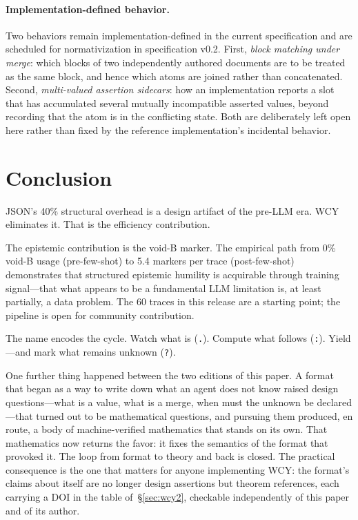\documentclass[11pt,a4paper]{article}
\begin{document}
\paragraph{Implementation-defined behavior.} Two behaviors remain implementation-defined in the current specification and are scheduled for normativization in specification v0.2. First, \emph{block matching under merge}: which blocks of two independently authored documents are to be treated as the same block, and hence which atoms are joined rather than concatenated. Second, \emph{multi-valued assertion sidecars}: how an implementation reports a slot that has accumulated several mutually incompatible asserted values, beyond recording that the atom is in the conflicting state. Both are deliberately left open here rather than fixed by the reference implementation's incidental behavior.

\section{Conclusion}
\label{sec:conclusion}

JSON's 40\% structural overhead is a design artifact of the pre-LLM era. WCY eliminates it. That is the efficiency contribution.

The epistemic contribution is the void-B marker. The empirical path from 0\% void-B usage (pre-few-shot) to 5.4 markers per trace (post-few-shot) demonstrates that structured epistemic humility is acquirable through training signal---that what appears to be a fundamental LLM limitation is, at least partially, a data problem. The 60 traces in this release are a starting point; the pipeline is open for community contribution.

The name encodes the cycle. Watch what is (\texttt{.}). Compute what follows (\texttt{:}). Yield---and mark what remains unknown (\texttt{?}).

One further thing happened between the two editions of this paper. A format that began as a way to write down what an agent does not know raised design questions---what is a value, what is a merge, when must the unknown be declared---that turned out to be mathematical questions, and pursuing them produced, en route, a body of machine-verified mathematics that stands on its own. That mathematics now returns the favor: it fixes the semantics of the format that provoked it. The loop from format to theory and back is closed. The practical consequence is the one that matters for anyone implementing WCY: the format's claims about itself are no longer design assertions but theorem references, each carrying a DOI in the table of~\S\ref{sec:wcy2}, checkable independently of this paper and of its author.
\end{document}
